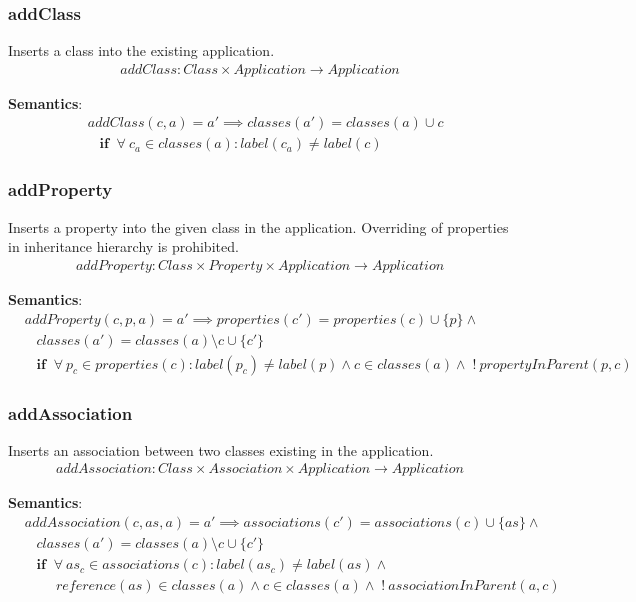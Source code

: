 \documentclass[10pt]{article}
\begin{document}
\subsubsection{addClass}
Inserts a class into the existing application.
\begin{align}
addClass: Class \times Application \rightarrow Application
\end{align}

\noindent \textbf{Semantics}:
\begin{align}
& addClass(c, a) = a' \implies classes(a') = classes(a) \cup c \nonumber \\
& \;\;\; \mathbf{if} \;\; \forall \: c_a \in classes(a): label(c_a) \neq label(c)
\end{align}

\subsubsection{addProperty}
Inserts a property into the given class in the application. Overriding of properties in inheritance hierarchy is prohibited.
\begin{align}
addProperty: Class \times Property \times Application \rightarrow Application 
\end{align}

\noindent \textbf{Semantics}:
\begin{align}
& addProperty(c, p, a) = a' \implies properties(c') = properties(c) \cup \{ p \}  \land \nonumber \\
& \;\;\; classes(a') = classes(a) \setminus c  \cup \{c'\}  \nonumber \\
& \;\;\; \mathbf{if} \;\; \forall \: p_c \in properties(c) : label(p_c) \neq label(p) \land c \in classes(a) \land \; !\:propertyInParent(p, c)
\end{align}

\subsubsection{addAssociation}
Inserts an association between two classes existing in the application.
\begin{align}
addAssociation: Class \times Association  \times Application \rightarrow Application
\end{align}

\noindent \textbf{Semantics}:
\begin{align}
& addAssociation(c, as, a) = a' \implies associations(c') = associations(c) \cup \{ as \}  \land \nonumber \\
& \;\;\; classes(a') = classes(a) \setminus c  \cup \{c'\}  \nonumber \\
& \;\;\; \mathbf{if} \;\; \forall \: as_c \in associations(c) : label(as_c) \neq label(as) \land \nonumber \\
& \;\;\;\;\;\;\;\; reference(as) \in classes(a) \land c \in classes(a) \land \; !\: associationInParent(a, c)
\end{align}
\end{document}
